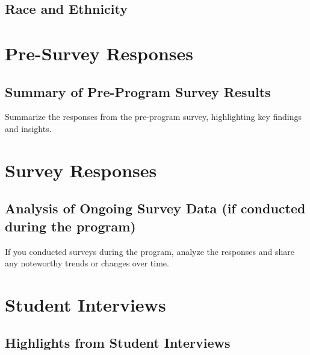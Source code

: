 \documentclass[
]{article}
\begin{document}
\hypertarget{race-and-ethnicity}{%
\subsection{Race and Ethnicity}\label{race-and-ethnicity}}

\hypertarget{section}{%
\subsection{}\label{section}}

\hypertarget{pre-survey-responses}{%
\section{Pre-Survey Responses}\label{pre-survey-responses}}

\hypertarget{summary-of-pre-program-survey-results}{%
\subsection{Summary of Pre-Program Survey
Results}\label{summary-of-pre-program-survey-results}}

Summarize the responses from the pre-program survey, highlighting key
findings and insights.

\hypertarget{survey-responses}{%
\section{Survey Responses}\label{survey-responses}}

\hypertarget{analysis-of-ongoing-survey-data-if-conducted-during-the-program}{%
\subsection{Analysis of Ongoing Survey Data (if conducted during the
program)}\label{analysis-of-ongoing-survey-data-if-conducted-during-the-program}}

If you conducted surveys during the program, analyze the responses and
share any noteworthy trends or changes over time.

\hypertarget{student-interviews}{%
\section{Student Interviews}\label{student-interviews}}

\hypertarget{highlights-from-student-interviews}{%
\subsection{Highlights from Student
Interviews}\label{highlights-from-student-interviews}}
\end{document}

